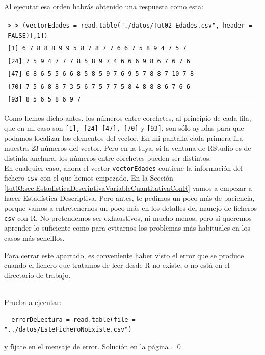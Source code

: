 \documentclass[10pt,a4paper]{article}\usepackage[]{graphicx}\usepackage[]{color}
\newcounter {cont01}
\begin{document}
Al ejecutar esa orden habrás obtenido una respuesta como esta: 
\begin{center}
\begin{tabular}{l}
{\tt > > (vectorEdades = read.table("./datos/Tut02-Edades.csv", header = FALSE)[,1])}\\
{\tt     [1]  6  7  8  8  8  9  9  5  8  7  8  7  7  6  6  7  5  8  9  4  7  5  7}\\
{\tt  [24]  7  5  9  4  7  7  7  8  5  8  9  7  4  6  6  6  9  8  6  7  6  7  6}\\
{\tt   [47]  6  8  6  5  5  6  6  8  5  8  5  9  7  6  9  5  7  8  8  7 10  7  8}\\
{\tt  [70]  7  5  6  8  8  7  3  5  6  7  5  7  7  5  8  4  8  8  8  6  7  6  6}\\
{\tt  [93]  8  5  6  5  8  6  9  7}
\end{tabular}
\end{center}
Como hemos dicho antes, los números entre corchetes, al principio de cada fila, que en mi caso son {\tt [1], [24]  [47], [70]} y {\tt [93]}, son sólo ayudas para que podamos localizar los elementos del vector. En mi pantalla cada primera fila muestra 23 números del vector. Pero en la tuya, si la ventana de RStudio es de distinta anchura, los números entre corchetes pueden ser distintos.\\

En cualquier caso, ahora el vector {\tt vectorEdades} contiene la información del fichero {\tt csv} con el que hemos  empezado. En la Sección \ref{tut03:sec:EstadisticaDescriptivaVariableCuantitativaConR} vamos a empezar a hacer Estadística Descriptiva. Pero antes, te pedimos un poco más de paciencia, porque vamos a entretenernos un poco más en los detalles del manejo de ficheros {\tt csv} con R. No pretendemos ser exhaustivos, ni mucho menos, pero sí queremos aprender lo suficiente como para evitarnos los problemas más habituales en los casos más sencillos.

Para cerrar este apartado, es conveniente haber visto el error que se produce cuando el fichero que tratamos de leer desde R no existe, o no está en el directorio de trabajo.
\begin{ejercicio}
\label{tut02:ejercicio04}
\quad\\
Prueba a ejecutar:
\begin{verbatim}
  errorDeLectura = read.table(file = "../datos/EsteFicheroNoExiste.csv")
\end{verbatim}
y fíjate en el mensaje de error. Solución en la página \pageref{tut02:ejercicio04:sol}.
\qed
\end{ejercicio}
\end{document}
